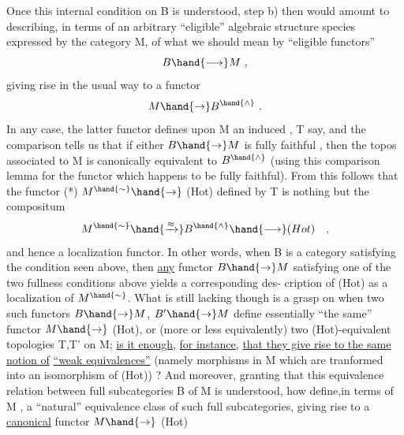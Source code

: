 
Once this internal condition on B is understood,  step b) then would
amount to describing,  in terms of an arbitrary ``eligible'' algebraic
structure species  expressed by the category M,  of what we should
mean by ``eligible functors''  
\[ B \hand{\longrightarrow} M \ , \]
giving rise in the usual way to a functor
\[ M \hand{\rightarrow} B^{\hand{\wedge}} \ . \]
In any case,  the latter functor defines upon M an induced ,
T say,  and the comparison  tells us that if either $B \hand{\rightarrow} M$  is fully
faithful ,  then the topos associated to M is canonically equivalent
to $B^{\hand{\wedge}}$  (using this comparison lemma for the functor which happens to be
fully faithful).   From this follows that the functor
(*)  $M^{\hand{\sim}} \hand{\rightarrow}$ (Hot)  defined by T  is nothing but the compositum
\[ M^{\hand{\sim}} \hand{\xrightarrow{\approx}} B^{\hand{\wedge}} \hand{\longrightarrow} (Hot) \quad , \]
and hence a localization functor.  In other words,  when B is a category
satisfying the condition seen above, then \uline{any} functor $B \hand{\rightarrow} M$ satisfying
one of the two fullness conditions above  yields a corresponding des-%
cription of (Hot) as a localization of $M^{\hand{\sim}}$.  What is still lacking though
is a grasp on when two such functors  $B \hand{\rightarrow} M$,  $B' \hand{\rightarrow} M$  define essentially
``the same'' functor  $M \hand{\rightarrow}$ (Hot),  or (more or less equivalently)  two
(Hot)-equivalent topologies T,T' on M;  \uline{is it enough,}  \uline{for instance,}
\uline{that they give rise to the same notion of} \uline{``weak equivalences''}  (namely 
morphisms in M which are tranformed into an isomorphism of (Hot)) ?
And moreover,   granting that this equivalence relation between
 full subcategories  B of M is understood,  how define,in terms of M ,
a ``natural'' equivalence class of such full subcategories,  giving rise
to a \uline{canonical} functor  $M \hand{\rightarrow}$ (Hot)   

